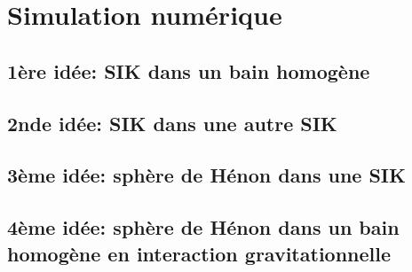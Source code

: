 

\chapter{Simulation numérique}
	\minitoc
	\section[1ère idée]{1ère idée: SIK dans un bain homogène}
		
	\section[2nde idée]{2nde idée: SIK dans une autre SIK}
		
	\section[3ème idée]{3ème idée: sphère de Hénon dans une SIK}
		
	\section[4ème idée]{4ème idée: sphère de Hénon dans un bain homogène en interaction gravitationnelle}
		\label{Simu::Idee4}
		
